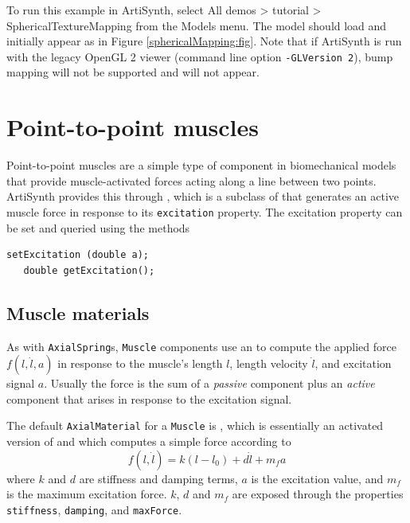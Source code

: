 To run this example in ArtiSynth, select {\sf All demos > tutorial >
SphericalTextureMapping} from the {\sf Models} menu. The model should
load and initially appear as in Figure
\ref{sphericalMapping:fig}. Note that if ArtiSynth is run with the
legacy OpenGL 2 viewer (command line option {\tt -GLVersion 2}), bump
mapping will not be supported and will not appear.

\section{Point-to-point muscles}
\label{PointToPointMuscles:sec}

Point-to-point muscles are a simple type of component in biomechanical
models that provide muscle-activated forces acting along a line
between two points. ArtiSynth provides this through
, which is a subclass of
 that generates an
active muscle force in response to its {\tt excitation} property. The
excitation property can be set and queried using the methods
%
\begin{lstlisting}[]
   setExcitation (double a);
   double getExcitation();
\end{lstlisting}
%

\subsection{Muscle materials}
\label{sec:mechii:musclematerials}

As with {\tt AxialSpring}s, {\tt Muscle} components use an
 to compute the
applied force $f (l, \dot l, a)$ in response to the muscle's length
$l$, length velocity $\dot l$, and excitation signal $a$.  Usually the
force is the sum of a {\it passive} component plus an {\it active}
component that arises in response to the excitation signal.

The default {\tt AxialMaterial} for a {\tt Muscle} is
,
which is essentially an activated version of 
and 
which computes a simple force according to
%
\begin{equation}
f(l, \dot l) = k (l-l_0) + d \dot l + m_f a
\label{SimpleAxialMuscle:eqn}
\end{equation}
%
where $k$ and $d$ are stiffness and damping terms, $a$ is the
excitation value, and $m_f$ is the maximum excitation force.
$k$, $d$ and $m_f$ are exposed through the properties {\tt
stiffness}, {\tt damping}, and {\tt maxForce}.


